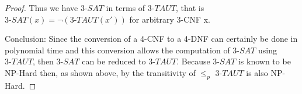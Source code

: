 \documentclass[11pt]{article}
\begin{document}
\begin{proof}
Thus we have $3\text{-}SAT$ in terms of $3\text{-}TAUT$, that is $3\text{-}SAT(x) = \neg(3\text{-}TAUT(x'))$ for arbitrary 3-CNF x.

Conclusion: Since the conversion of a 4-CNF to a 4-DNF can certainly be done in polynomial time and this conversion allows the computation of $3\text{-}SAT$ using $3\text{-}TAUT$, then $3\text{-}SAT$ can be reduced to $3\text{-}TAUT$. Because $3\text{-}SAT$ is known to be NP-Hard then, as shown above, by the transitivity of $\leq_{p}$ $3\text{-}TAUT$ is also NP-Hard.

\end{proof}
\end{document}
